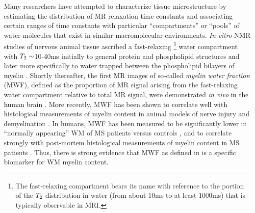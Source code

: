 Many researchers have attempted 
to characterize tissue microstructure
by estimating the distribution
of MR relaxation time constants
and associating certain ranges of time constants
with particular ``compartments'' or ``pools'' of water molecules
that exist in similar macromolecular environments.
\emph{In vitro} NMR studies
of nervous animal tissue
ascribed a fast-relaxing
\footnote{%
	The fast-relaxing compartment bears its name 
	with reference to the portion 
	of the $T_2$ distribution in water
	(from about $10$ms to at least $1000$ms)
	that is typically observable in MRI.
}
water compartment
with $T_2\sim$10-40ms 
initially to general protein 
and phospholipid structures \cite{vasilescu:78:wci}
and later more specifically
to water trapped between
the phospholipid bilayers 
of myelin
\cite{menon:91:aoc, stewart:93:ssr}.
Shortly thereafter,
the first MR images 
of so-called \emph{myelin water fraction} (MWF),
defined as the proportion of MR signal 
arising from the fast-relaxing water compartment
relative to total MR signal,
were demonstrated \emph{in vivo}
in the human brain \cite{mackay:94:ivv}.
More recently,
MWF has been shown 
to correlate well 
with histological measurements
of myelin content 
in animal models
of nerve injury \cite{gareau:00:mta}
and demyelination \cite{webb:03:imt}.
In humans, 
MWF has been measured 
to be significantly lower
in ``normally appearing'' WM 
of MS patients versus controls \cite{laule:04:wca},
and to correlate strongly 
with post-mortem histological measurements
of myelin content
in MS patients \cite{laule:06:mwi}.
Thus,
there is strong evidence
that MWF as defined in \cite{mackay:94:ivv}
is a specific biomarker
for WM myelin content.

